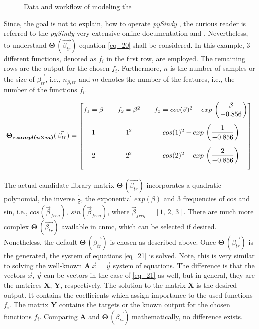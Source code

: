 \begin{figure} [!h]
    \hspace*{-4cm} 
    \resizebox{1.2\textwidth}{!}{
    
    }
    \caption{Data and workflow of modeling the } 
    \label{fig_43}
\end{figure}

Since, the goal is not to explain, how to operate \emph{pySindy} \cite{Brunton2016}, the curious reader is referred to the \emph{pySindy} very extensive online documentation and \cite{Silva2020,Kaptanoglu2022}.
Nevertheless, to understand $\boldsymbol{\Theta}\,(\vec{\beta_{tr}})$ equation \eqref{eq_20} shall be considered. 
In this example, 3 different functions, denoted as $f_i$ in the first row, are employed.
The remaining rows are the output for the chosen $f_i$.
Furthermore, $n$ is the number of samples or the size of $\vec{\beta_{tr} }$, i.e., $n_{\beta,tr} $ and $m$ denotes the number of the features, i.e., the number of the functions $f_i$. \newline

\begin{equation}
    \boldsymbol{\Theta_{exampl(n \times m )}}(\,\vec{\beta_{tr}}) =
    \renewcommand\arraycolsep{10pt} 
    \begin{bmatrix}
      f_1 = \beta & f_2 = \beta^2 & f_2 = cos(\beta)^2 - exp\,\left(\dfrac{\beta}{-0.856} \right) \\[1.5em]
      1  & 1^2 & cos(1)^2 - exp\,\left(\dfrac{1}{-0.856} \right) \\[1.5em]
      2 &  2^2  & cos(2)^2 - exp\,\left(\dfrac{2}{-0.856} \right) \\[1.5em]
    \end{bmatrix}
    \label{eq_20}
\end{equation}

The actual candidate library matrix $\boldsymbol{\Theta}\,(\vec{\beta_{tr}})$ incorporates  a quadratic polynomial, the inverse $ \frac{1}{\beta}$, the exponential $exp(\beta)$ and 3 frequencies of cos and sin, i.e., $cos(\vec{\beta}_{freq}), \ sin(\vec{\beta}_{freq})$, where $\vec{\beta}_{freq} = [1, \, 2,\, 3]$. 
There are much more complex $\boldsymbol{\Theta}\,(\vec{\beta_{tr}})$  available in \gls{cnmc}, which can be selected if desired. 
Nonetheless, the default $\boldsymbol{\Theta}\,(\vec{\beta_{tr}})$ is chosen as described above.
Once $\boldsymbol{\Theta}\,(\vec{\beta_{tr}})$  is the generated, the system of equations \eqref{eq_21} is solved. 
Note, this is very similar to solving the well-known $\bm A \, \vec{x} =  \vec{y}$ system of equations.
The difference is that the vectors $\vec{x}, \, \vec{y}$ can be vectors in the case of \eqref{eq_21} as well, but in general, they are the matrices $\bm{X} ,\, \bm Y$, respectively. The solution to the matrix $\bm{X}$ is the desired output.
It contains the coefficients which assign importance to the used functions $f_i$. 
The matrix $\bm Y$ contains the targets or the known output for the chosen functions $f_i$.
Comparing $\bm A$ and $ \boldsymbol{\Theta}\,(\vec{\beta_{tr}})$ mathematically, no difference exists.\newline
 
